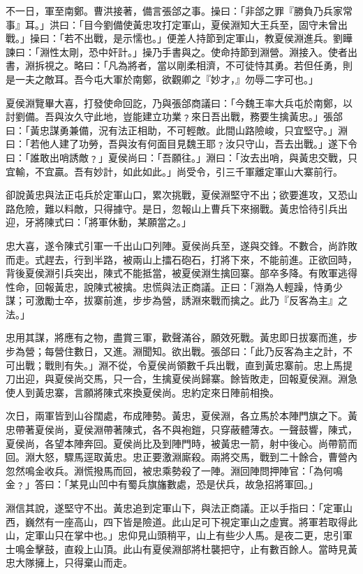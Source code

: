 不一日，軍至南鄭。曹洪接著，備言張郃之事。操曰：「非郃之罪『勝負乃兵家常事』耳。」洪曰：「目今劉備使黃忠攻打定軍山，夏侯淵知大王兵至，固守未曾出戰。」操曰：「若不出戰，是示懦也。」便差人持節到定軍山，教夏侯淵進兵。劉瞱諫曰：「淵性太剛，恐中奸計。」操乃手書與之。使命持節到淵營。淵接入。使者出書，淵拆視之。略曰：「凡為將者，當以剛柔相濟，不可徒恃其勇。若但任勇，則是一夫之敵耳。吾今屯大軍於南鄭，欲觀卿之『妙才，』勿辱二字可也。」

夏侯淵覽畢大喜，打發使命回訖，乃與張郃商議曰：「今魏王率大兵屯於南鄭，以討劉備。吾與汝久守此地，豈能建立功業﹖來日吾出戰，務要生擒黃忠。」張郃曰：「黃忠謀勇兼備，況有法正相助，不可輕敵。此間山路險峻，只宜堅守。」淵曰：「若他人建了功勞，吾與汝有何面目見魏王耶﹖汝只守山，吾去出戰。」遂下令曰：「誰敢出哨誘敵﹖」夏侯尚曰：「吾願往。」淵曰：「汝去出哨，與黃忠交戰，只宜輸，不宜贏。吾有妙計，如此如此。」尚受令，引三千軍離定軍山大寨前行。

卻說黃忠與法正屯兵於定軍山口，累次挑戰，夏侯淵堅守不出；欲要進攻，又恐山路危險，難以料敵，只得據守。是日，忽報山上曹兵下來搦戰。黃忠恰待引兵出迎，牙將陳式曰：「將軍休動，某願當之。」

忠大喜，遂令陳式引軍一千出山口列陣。夏侯尚兵至，遂與交鋒。不數合，尚詐敗而走。式趕去，行到半路，被兩山上擂石砲石，打將下來，不能前進。正欲回時，背後夏侯淵引兵突出，陳式不能抵當，被夏侯淵生擒回寨。部卒多降。有敗軍逃得性命，回報黃忠，說陳式被擒。忠慌與法正商議。正曰：「淵為人輕躁，恃勇少謀；可激勵士卒，拔寨前進，步步為營，誘淵來戰而擒之。此乃『反客為主』之法。」

忠用其謀，將應有之物，盡賞三軍，歡聲滿谷，願效死戰。黃忠即日拔寨而進，步步為營；每營住數日，又進。淵聞知。欲出戰。張郃曰：「此乃反客為主之計，不可出戰；戰則有失。」淵不從，令夏侯尚領數千兵出戰，直到黃忠寨前。忠上馬提刀出迎，與夏侯尚交馬，只一合，生擒夏侯尚歸寨。餘皆敗走，回報夏侯淵。淵急使人到黃忠寨，言願將陳式來換夏侯尚。忠約定來日陣前相換。

次日，兩軍皆到山谷闊處，布成陣勢。黃忠，夏侯淵，各立馬於本陣門旗之下。黃忠帶著夏侯尚，夏侯淵帶著陳式，各不與袍鎧，只穿蔽體薄衣。一聲鼓響，陳式，夏侯尚，各望本陣奔回。夏侯尚比及到陣門時，被黃忠一箭，射中後心。尚帶箭而回。淵大怒，驟馬逕取黃忠。忠正要激淵廝殺。兩將交馬，戰到二十餘合，曹營內忽然鳴金收兵。淵慌撥馬而回，被忠乘勢殺了一陣。淵回陣問押陣官：「為何鳴金﹖」答曰：「某見山凹中有蜀兵旗旛數處，恐是伏兵，故急招將軍回。」

淵信其說，遂堅守不出。黃忠追到定軍山下，與法正商議。正以手指曰：「定軍山西，巍然有一座高山，四下皆是險道。此山足可下視定軍山之虛實。將軍若取得此山，定軍山只在掌中也。」忠仰見山頭稍平，山上有些少人馬。是夜二更，忠引軍士鳴金擊鼓，直殺上山頂。此山有夏侯淵部將杜襲把守，止有數百餘人。當時見黃忠大隊擁上，只得棄山而走。

